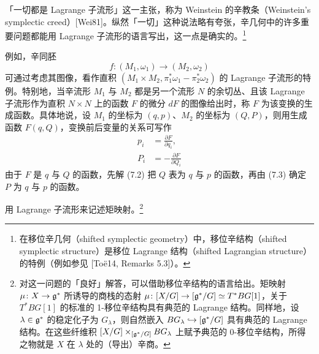 「一切都是 Lagrange 子流形」这一主张，称为 Weinstein 的辛教条（Weinstein's symplectic creed）[Wei81]。纵然「一切」这种说法略有夸张，辛几何中的许多重要问题都能用 Lagrange 子流形的语言写出，这一点是确实的。\footnote{在移位辛几何（shifted symplectic geometry）中，移位辛结构（shifted symplectic structure）是移位 Lagrange 结构（shifted Lagrangian structure）的特例（例如参见 [Toë14, Remarks 5.3]）。}

例如，辛同胚
\begin{equation}
    f\colon(M_1,\omega_1)\to(M_2,\omega_2) \tag{7.1}
\end{equation}
可通过考虑其图像，看作直积 $(M_1\times M_2,\pi_1^*\omega_1-\pi_2^*\omega_2)$ 的 Lagrange 子流形的特例。特别地，当辛流形 $M_1$ 与 $M_2$ 都是另一个流形 $N$ 的余切丛、且该 Lagrange 子流形作为直积 $N\times N$ 上的函数 $F$ 的微分 $dF$ 的图像给出时，称 $F$ 为该变换的生成函数。具体地说，设 $M_1$ 的坐标为 $(q,p)$、$M_2$ 的坐标为 $(Q,P)$，则用生成函数 $F(q,Q)$，变换前后变量的关系可写作
\begin{align}
    p_i &= \frac{\partial F}{\partial q_i}, \tag{7.2} \\
    P_i &= -\frac{\partial F}{\partial Q_i} \tag{7.3}
\end{align}
由于 $F$ 是 $q$ 与 $Q$ 的函数，先解 (7.2) 把 $Q$ 表为 $q$ 与 $p$ 的函数，再由 (7.3) 确定 $P$ 为 $q$ 与 $p$ 的函数。

\begin{exercise}
用 Lagrange 子流形来记述矩映射。\footnote{对这一问题的「良好」解答，可以借助移位辛结构的语言给出。矩映射 $\mu\colon X\to\mathfrak{g}^*$ 所诱导的商栈的态射 $\mu\colon[X/G]\to[\mathfrak{g}^*/G]\simeq T^*BG[1]$，关于 $T^*BG[1]$ 的标准的 1-移位辛结构具有典范的 Lagrange 结构。同样地，设 $\lambda\in\mathfrak{g}^*$ 的稳定化子为 $G_\lambda$，则自然嵌入 $BG_\lambda\hookrightarrow[\mathfrak{g}^*/G]$ 具有典范的 Lagrange 结构。在这些纤维积 $[X/G]\times_{[\mathfrak{g}^*/G]}BG_\lambda$ 上赋予典范的 0-移位辛结构，所得之物就是 $X$ 在 $\lambda$ 处的（导出）辛商。}
\end{exercise}

